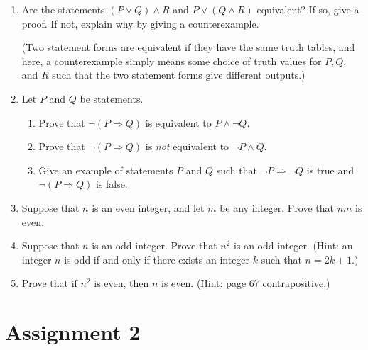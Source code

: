 \documentclass[12pt]{article}
\begin{document}
\begin{enumerate}
  
\item Are the statements $(P \vee Q) \wedge R$ and $P \vee (Q \wedge R)$ equivalent? If so, give a proof. If not, explain why by giving a counterexample.

  (Two statement forms are equivalent if they have the same truth tables, and here, a counterexample simply means some choice of truth values for $P,Q,$ and $R$ such that the two statement forms give different outputs.)
\item Let $P$ and $Q$ be statements.
  \begin{enumerate}
  \item Prove that $\neg(P \Rightarrow Q)$ is equivalent to $P \wedge \neg Q$.
  \item Prove that $\neg(P \Rightarrow Q)$ is \emph{not} equivalent to $\neg P \wedge Q$.
  \item Give an example of statements $P$ and $Q$ such that $\neg P \Rightarrow \neg Q$ is true and $\neg(P \Rightarrow Q)$ is false.
  \end{enumerate}



\item Suppose that $n$ is an even integer, and let $m$ be any integer. Prove that $nm$ is even.   
  
\item Suppose that $n$ is an odd integer. Prove that $n^2$ is an odd integer. (Hint: an integer $n$ is odd if and only if there exists an integer $k$ such that $n = 2k+1$.)

\item Prove that if $n^2$ is even, then $n$ is even. (Hint: \sout{page 67} contrapositive.)  
  \end{enumerate}

\newpage
\section[2 (due \csname dateWeek2\endcsname): ``Direct'' proofs and divisibility problems.]{Assignment 2}
\end{document}
